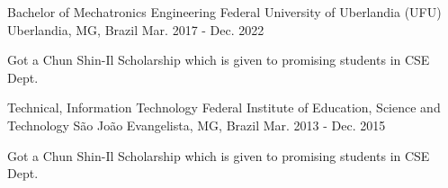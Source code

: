 

\begin{cventries}

  \cventry
    {Bachelor of Mechatronics Engineering} %
    {Federal University of Uberlandia (UFU)} %
    {Uberlandia, MG, Brazil} %
    {Mar. 2017 - Dec. 2022} %
    {
      \begin{cvitems} %
        \item {Got a Chun Shin-Il Scholarship which is given to promising students in CSE Dept.}
      \end{cvitems}
    }


\cventry
{Technical, Information Technology} %
{Federal Institute of Education, Science and Technology} %
{São João Evangelista, MG, Brazil} %
{Mar. 2013 - Dec. 2015} %
{
  \begin{cvitems} %
    \item {Got a Chun Shin-Il Scholarship which is given to promising students in CSE Dept.}
  \end{cvitems}
}

\end{cventries}
